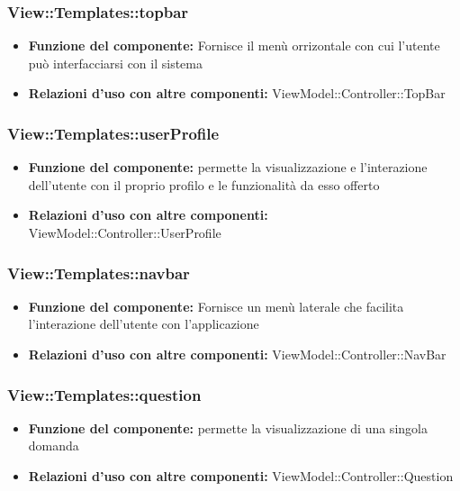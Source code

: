 \subsubsection{View::Templates::topbar}
\begin{itemize}
\item\textbf{Funzione del componente:} Fornisce il menù orrizontale con cui l'utente può interfacciarsi con il sistema\\
\item\textbf{Relazioni d'uso con altre componenti:} ViewModel::Controller::TopBar\\
\end{itemize}
\subsubsection{View::Templates::userProfile}
\begin{itemize}
\item\textbf{Funzione del componente:} permette la visualizzazione e l'interazione dell'utente con il proprio profilo e le funzionalità da esso offerto\\
\item\textbf{Relazioni d'uso con altre componenti:} ViewModel::Controller::UserProfile\\
\end{itemize}
\subsubsection{View::Templates::navbar}
\begin{itemize}
\item\textbf{Funzione del componente:} Fornisce un menù laterale che facilita l'interazione dell'utente con l'applicazione\\
\item\textbf{Relazioni d'uso con altre componenti:} ViewModel::Controller::NavBar\\
\end{itemize}
\subsubsection{View::Templates::question}
\begin{itemize}
\item\textbf{Funzione del componente:} permette la visualizzazione di una singola domanda\\
\item\textbf{Relazioni d'uso con altre componenti:} ViewModel::Controller::Question\\
\end{itemize}
